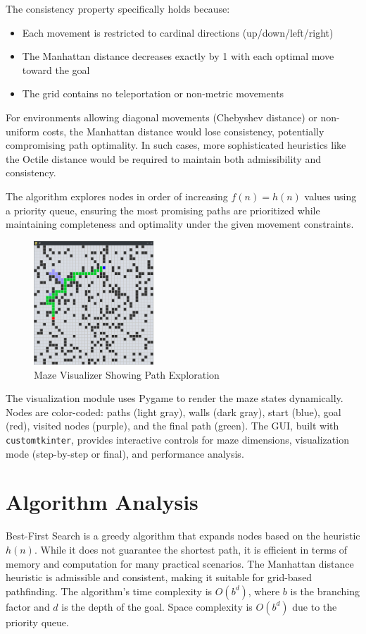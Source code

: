 \documentclass{report}
\begin{document}
The consistency property specifically holds because:
\begin{itemize}
	\item Each movement is restricted to cardinal directions (up/down/left/right)
	\item The Manhattan distance decreases exactly by 1 with each optimal move toward the goal
	\item The grid contains no teleportation or non-metric movements
\end{itemize}

For environments allowing diagonal movements (Chebyshev distance) or non-uniform costs, the Manhattan distance would lose consistency, potentially compromising path optimality. In such cases, more sophisticated heuristics like the Octile distance would be required to maintain both admissibility and consistency.

The algorithm explores nodes in order of increasing $f(n) = h(n)$ values using a priority queue, ensuring the most promising paths are prioritized while maintaining completeness and optimality under the given movement constraints.

\begin{figure}[h]
    \centering
    \includegraphics[width=0.4\textwidth]{assets/solver}
    \caption{Maze Visualizer Showing Path Exploration}
    \label{fig:visualizer}
\end{figure}

The visualization module uses Pygame to render the maze states dynamically. Nodes are color-coded: paths (light gray), walls (dark gray), start (blue), goal (red), visited nodes (purple), and the final path (green). The GUI, built with \texttt{customtkinter}, provides interactive controls for maze dimensions, visualization mode (step-by-step or final), and performance analysis.

\section{Algorithm Analysis}
Best-First Search is a greedy algorithm that expands nodes based on the heuristic $h(n)$. While it does not guarantee the shortest path, it is efficient in terms of memory and computation for many practical scenarios. The Manhattan distance heuristic is admissible and consistent, making it suitable for grid-based pathfinding. The algorithm's time complexity is $O(b^d)$, where $b$ is the branching factor and $d$ is the depth of the goal. Space complexity is $O(b^d)$ due to the priority queue.
\end{document}
